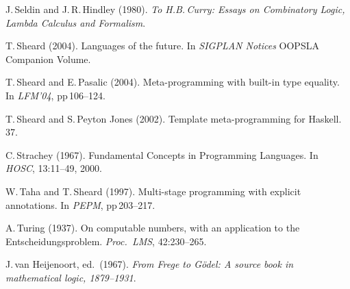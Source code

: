\documentclass[11pt,twocolumn]{article}
\newcommand{\hide}[1]{}
\begin{document}
{\begin{thebibliography}{000}
J.\,Seldin and J.\,R.\,Hindley (1980).
\newblock \emph{To H.B.\,Curry: Essays on Combinatory Logic, Lambda
  Calculus and Formalism}.

\hide{
\bibitem{Selinger}
P.\,Selinger (2011).
\newblock A survey of graphical languages for monoidal categories.
\newblock In LNP 813, pp\,289--355. 
}

T.\,Sheard (2004).
\newblock Languages of the future.
\newblock In \emph{SIGPLAN Notices} OOPSLA Companion Volume.

T.\,Sheard and E.\,Pasalic (2004).
\newblock Meta-programming with built-in type equality.
\newblock In {\em LFM'04}, pp\,106--124.

T.\,Sheard and S.\,Peyton Jones (2002).
\newblock Template meta-programming for {Haskell}.
 37.

C.\,Strachey (1967).
\newblock Fundamental Concepts in Programming Languages.  
\newblock In \emph{HOSC}, 13:11--49, 2000.


W.\,Taha and T.\,Sheard (1997).
\newblock Multi-stage programming with explicit annotations.
\newblock In {\em PEPM}, pp\,203--217.

A.\,Turing (1937). 
\newblock On computable numbers, with an application to the
  Entscheidungsproblem. 
\newblock \emph{Proc.\ LMS}, 42:230--265.

J.\,van Heijenoort, ed.\ (1967).
\newblock \emph{From Frege to G\"odel: A source book in mathematical
  logic, 1879--1931}.


\end{thebibliography}}
\end{document}
